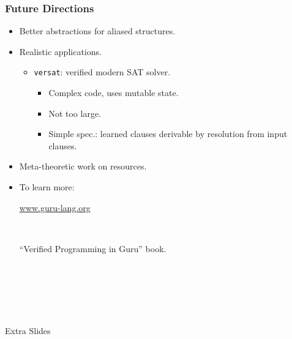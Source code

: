 \documentclass[10pt]{beamer}
\begin{document}
\begin{frame}
\frametitle{Future Directions}

\begin{itemize}
\item Better abstractions for aliased structures.

\item Realistic applications.

\begin{itemize}
\item \texttt{versat}: verified modern SAT solver.
\begin{itemize}
\item Complex code, uses mutable state.
\item Not too large.
\item Simple spec.: learned clauses derivable by resolution from input clauses.
\end{itemize}
\end{itemize}

\item Meta-theoretic work on resources.

\item To learn more:

\begin{center}
\Large
\textcolor{blue}{\url{www.guru-lang.org}}
\end{center}

\ 

``Verified Programming in Guru'' book.

\end{itemize}

\end{frame}

\begin{frame}[plain]
\ 

\ 

\ 

\Large
\begin{center}
Extra Slides
\end{center}
\end{frame}
\end{document}
